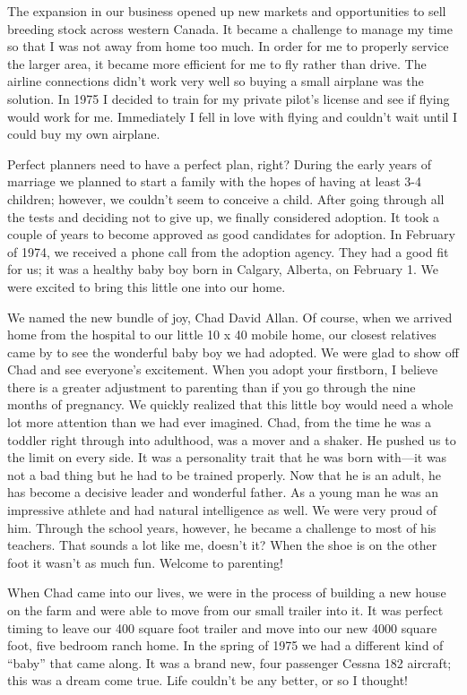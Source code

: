 \documentclass[oneside]{book}
\begin{document}
The expansion in our business opened up new markets and opportunities to sell breeding stock across western Canada. It became a challenge to manage my time so that I was not away from home too much. In order for me to properly service the larger area, it became more efficient for me to fly rather than drive. The airline connections didn’t work very well so buying a small airplane was the solution. In 1975 I decided to train for my private pilot's license and see if flying would work for me. Immediately I fell in love with flying and couldn't wait until I could buy my own airplane.

Perfect planners need to have a perfect plan, right? During the early years of marriage we planned to start a family with the hopes of having at least 3-4 children; however, we couldn't seem to conceive a child. After going through all the tests and deciding not to give up, we finally considered adoption. It took a couple of years to become approved as good candidates for adoption. In February of 1974, we received a phone call from the adoption agency. They had a good fit for us; it was a healthy baby boy born in Calgary, Alberta, on February 1. We were excited to bring this little one into our home.

We named the new bundle of joy, Chad David Allan. Of course, when we arrived home from the hospital to our little 10 x 40 mobile home, our closest relatives came by to see the wonderful baby boy we had adopted. We were glad to show off Chad and see everyone's excitement. When you adopt your firstborn, I believe there is a greater adjustment to parenting than if you go through the nine months of pregnancy. We quickly realized that this little boy would need a whole lot more attention than we had ever imagined. Chad, from the time he was a toddler right through into adulthood, was a mover and a shaker. He pushed us to the limit on every side. It was a personality trait that he was born with—it was not a bad thing but he had to be trained properly. Now that he is an adult, he has become a decisive leader and wonderful father. As a young man he was an impressive athlete and had natural intelligence as well. We were very proud of him. Through the school years, however, he became a challenge to most of his teachers. That sounds a lot like me, doesn’t it?  When the shoe is on the other foot it wasn’t as much fun. Welcome to parenting! 

When Chad came into our lives, we were in the process of building a new house on the farm and were able to move from our small trailer into it. It was perfect timing to leave our 400 square foot trailer and move into our new 4000 square foot, five bedroom ranch home. In the spring of 1975 we had a different kind of “baby” that came along. It was a brand new, four passenger Cessna 182 aircraft; this was a dream come true. Life couldn't be any better, or so I thought!
\end{document}
